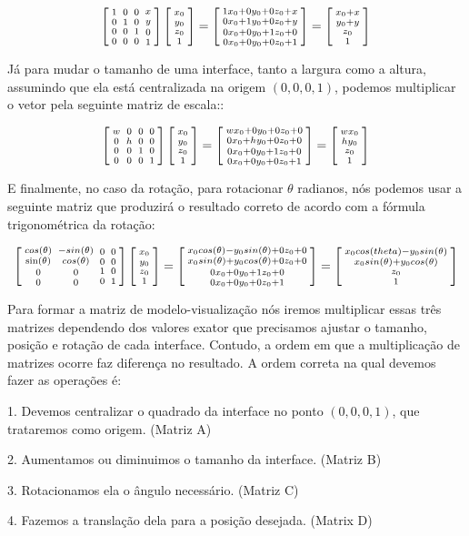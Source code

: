$$ \left[{{1 \atop 0}\atop {0\atop 0}}{{0 \atop 1}\atop {0 \atop
      0}}{{0\atop 0}\atop{1 \atop 0}}{{x \atop y}\atop{0\atop
      1}}\right]\left[{{x_0\atop y_0}\atop {z_0\atop
      1}}\right]=\left[{{1x_0+0y_0+0z_0+x\atop 0x_0+1y_0+0z_0+y}\atop
    {0x_0+0y_0+1z_0+0\atop
      0x_0+0y_0+0z_0+1}}\right]=\left[{{x_0+x\atop y_0+y}\atop
    {z_0\atop 1}}\right]
$$

Já para mudar o tamanho de uma interface, tanto a largura como a
altura, assumindo que ela está centralizada na origem $(0, 0, 0, 1)$,
podemos multiplicar o vetor pela seguinte matriz de escala::

$$ \left[{{w \atop 0}\atop {0\atop 0}}{{0 \atop h}\atop {0 \atop
      0}}{{0\atop 0}\atop{1 \atop 0}}{{0 \atop 0}\atop{0\atop
      1}}\right]\left[{{x_0\atop y_0}\atop {z_0\atop
      1}}\right]=\left[{{wx_0+0y_0+0z_0+0\atop 0x_0+hy_0+0z_0+0}\atop
    {0x_0+0y_0+1z_0+0\atop 0x_0+0y_0+0z_0+1}}\right]=\left[{{wx_0\atop
      hy_0}\atop {z_0\atop 1}}\right]
$$

E finalmente, no caso da rotação, para rotacionar $\theta$ radianos,
nós podemos usar a seguinte matriz que produzirá o resultado correto
de acordo com a fórmula trigonométrica da rotação:

$$ \left[{{cos(\theta) \atop \sin(\theta)}\atop {0\atop
      0}}{{-sin(\theta) \atop cos(\theta)}\atop {0 \atop 0}}{{0\atop
      0}\atop{1 \atop 0}}{{0 \atop 0}\atop{0\atop
      1}}\right]\left[{{x_0\atop y_0}\atop {z_0\atop
      1}}\right]=\left[{{x_0 cos(\theta)-y_0 sin(\theta)+0z_0+0\atop
      x_0 sin(\theta)+y_0 cos(\theta)+0z_0+0}\atop
    {0x_0+0y_0+1z_0+0\atop 0x_0+0y_0+0z_0+1}}\right]=\left[{{x_0
      cos(theta) - y_0 sin(\theta) \atop x_0 sin(\theta) + y_0
      cos(\theta)}\atop {z_0\atop 1}}\right]
$$

Para formar a matriz de modelo-visualização nós iremos multiplicar
essas três matrizes dependendo dos valores exator que precisamos
ajustar o tamanho, posição e rotação de cada interface. Contudo, a
ordem em que a multiplicação de matrizes ocorre faz diferença no
resultado. A ordem correta na qual devemos fazer as operações é:

1. Devemos centralizar o quadrado da interface no ponto $(0, 0, 0,
1)$, que trataremos como origem. (Matriz A)

2. Aumentamos ou diminuimos o tamanho da interface. (Matriz B)

3. Rotacionamos ela o ângulo necessário. (Matriz C)

4. Fazemos a translação dela para a posição desejada. (Matrix D)

